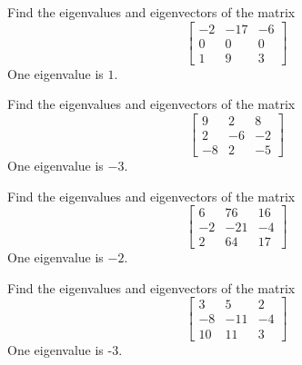 \documentclass{ximera}
\begin{document}
\begin{problem}\label{prb:8.10} Find the eigenvalues and eigenvectors of the matrix
\begin{equation*}
\left[
\begin{array}{rrr}
-2 & -17 & -6 \\
0 & 0 & 0 \\
1 & 9 & 3
\end{array}
\right]
\end{equation*}
One eigenvalue is $1.$
\end{problem}

\begin{problem}\label{prb:8.11} Find the eigenvalues and eigenvectors of the matrix
\begin{equation*}
\left[
\begin{array}{rrr}
9 & 2 & 8 \\
2 & -6 & -2 \\
-8 & 2 & -5
\end{array}
\right]
\end{equation*}
One eigenvalue is $-3.$
\end{problem}

\begin{problem}\label{prb:8.12} Find the eigenvalues and eigenvectors of the matrix
\begin{equation*}
\left[
\begin{array}{rrr}
6 & 76 & 16 \\
-2 & -21 & -4 \\
2 & 64 & 17
\end{array}
\right]
\end{equation*}
One eigenvalue is $-2.$
\end{problem}

\begin{problem}\label{prb:8.13} Find the eigenvalues and eigenvectors of the matrix
\begin{equation*}
\left[
\begin{array}{rrr}
3 & 5 & 2 \\
-8 & -11 & -4 \\
10 & 11 & 3
\end{array}
\right]
\end{equation*}
One eigenvalue is -3.
\end{problem}
\end{document}
